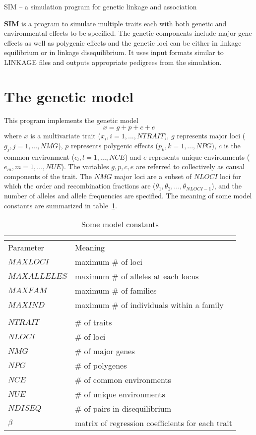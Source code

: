 \documentclass[12pt]{article}
\begin{document}
\centerline{\large SIM -- a simulation program for genetic linkage and association}

\bigskip

{\bf SIM} is a program to simulate multiple traits each with both genetic and environmental
effects to be specified. The genetic components include 
major gene effects as well as polygenic effects and the genetic loci can be
either in linkage equilibrium or in linkage disequilibrium. It uses input formats
similar to LINKAGE files and outputs appropriate pedigrees from the simulation.

\section{The genetic model}

This program implements the genetic model $$x=g+p+c+e$$ where $x$ is a multivariate trait
($x_i,i=1,...,NTRAIT$), $g$ represents major loci ($g_j,j=1,...,NMG$), $p$ represents
polygenic effects ($p_k,k=1,...,NPG)$, $c$ is the common environment ($c_l,l=1,...,NCE$) and
$e$ represents unique environments ($e_m,m=1,...,NUE$). The variables $g, p, c, e$ are
referred to collectively as causal components of the trait. The $NMG$ major loci are a subset
of $NLOCI$ loci for which the order and recombination fractions are
($\theta_1,\theta_2,...,\theta_{NLOCI-1}$), and the number of alleles and allele frequencies
are specified. The meaning of some model constants are summarized in table~\ref{tab1}.

\begin{table}[h]\centering
\caption{Some model constants\label{tab1}}
\begin{tabular}{l|l}
\multicolumn{2}{c}{}\\
\hline
Parameter & Meaning \\
\hline
$MAXLOCI$ & maximum \# of loci\\
$MAXALLELES$ & maximum \# of alleles at each locus\\
$MAXFAM$ & maximum \# of families\\
$MAXIND$ & maximum \# of individuals within a family\\
\\
$NTRAIT$ & \# of traits\\
$NLOCI$  & \# of loci\\
$NMG$ & \# of major genes\\
$NPG$ & \# of polygenes\\
$NCE$ & \# of common environments\\
$NUE$ & \# of unique environments\\
$NDISEQ$ & \# of pairs in disequilibrium\\
$\beta$ & matrix of regression coefficients for each trait\\
\hline
\end{tabular}\end{table}
\end{document}
